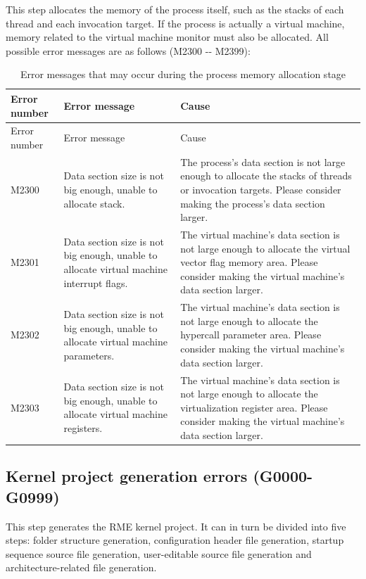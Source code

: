 This step allocates the memory of the process itself, such as the stacks of each thread and each invocation target. If the process is actually a virtual machine, memory related to the virtual machine monitor must also be allocated. All possible error messages are as follows (M2300
-\/- M2399):

\begin{xltabular}{\textwidth}{@{}>{\hsize\raggedright\arraybackslash}X>{\hsize\raggedright\arraybackslash}X>{\hsize\raggedright\arraybackslash}X@{}}
\caption{Error messages that may occur during the process memory allocation stage}\label{tab:5-26}\\
\toprule
Error number & Error message & Cause\tabularnewline
\endfirsthead
\toprule
Error number & Error message & Cause\tabularnewline
\midrule
\endhead
\bottomrule
\endlastfoot
M2300 & Data section size is not big enough, unable to allocate stack. &
The process's data section is not large enough to allocate the stacks of threads or invocation targets. Please consider making the process's data section larger.\tabularnewline
M2301 & Data section size is not big enough, unable to allocate virtual
machine interrupt flags. &
The virtual machine's data section is not large enough to allocate the virtual vector flag memory area. Please consider making the virtual machine's data section larger.\tabularnewline
M2302 & Data section size is not big enough, unable to allocate virtual
machine parameters. &
The virtual machine's data section is not large enough to allocate the hypercall parameter area. Please consider making the virtual machine's data section larger.\tabularnewline
M2303 & Data section size is not big enough, unable to allocate virtual
machine registers. &
The virtual machine's data section is not large enough to allocate the virtualization register area. Please consider making the virtual machine's data section larger.\tabularnewline
\end{xltabular}

\subsection{Kernel project generation errors (G0000-G0999)}\label{subsec:5-6-7}

This step generates the RME kernel project. It can in turn be divided into five steps: folder structure generation, configuration header file generation, startup sequence source file generation, user-editable source file generation and architecture-related file generation.

